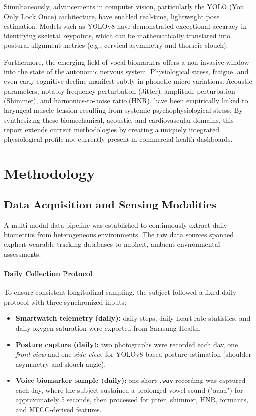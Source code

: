 \documentclass[11pt,a4paper]{article}
\begin{document}
Simultaneously, advancements in computer vision, particularly the YOLO (You Only Look Once) architecture, have enabled real-time, lightweight pose estimation. Models such as YOLOv8 have demonstrated exceptional accuracy in identifying skeletal keypoints, which can be mathematically translated into postural alignment metrics (e.g., cervical asymmetry and thoracic slouch). 

Furthermore, the emerging field of vocal biomarkers offers a non-invasive window into the state of the autonomic nervous system. Physiological stress, fatigue, and even early cognitive decline manifest subtly in phonetic micro-variations. Acoustic parameters, notably frequency perturbation (Jitter), amplitude perturbation (Shimmer), and harmonics-to-noise ratio (HNR), have been empirically linked to laryngeal muscle tension resulting from systemic psychophysiological stress. By synthesizing these biomechanical, acoustic, and cardiovascular domains, this report extends current methodologies by creating a uniquely integrated physiological profile not currently present in commercial health dashboards.

\section{Methodology}
\subsection{Data Acquisition and Sensing Modalities}
A multi-modal data pipeline was established to continuously extract daily biometrics from heterogeneous environments. The raw data sources spanned explicit wearable tracking databases to implicit, ambient environmental assessments.

\paragraph{Daily Collection Protocol}
To ensure consistent longitudinal sampling, the subject followed a fixed daily protocol with three synchronized inputs:
\begin{itemize}
    \item \textbf{Smartwatch telemetry (daily):} daily steps, daily heart-rate statistics, and daily oxygen saturation were exported from Samsung Health.
    \item \textbf{Posture capture (daily):} two photographs were recorded each day, one \emph{front-view} and one \emph{side-view}, for YOLOv8-based posture estimation (shoulder asymmetry and slouch angle).
    \item \textbf{Voice biomarker sample (daily):} one short \texttt{.wav} recording was captured each day, where the subject sustained a prolonged vowel sound ("aaah") for approximately 5 seconds, then processed for jitter, shimmer, HNR, formants, and MFCC-derived features.
\end{itemize}
\end{document}

